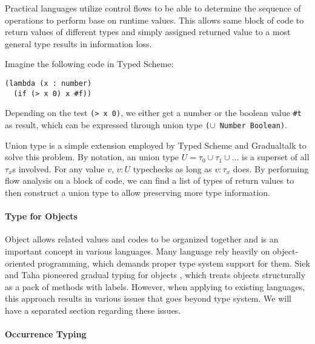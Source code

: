 Practical languages utilize control flows to be able to determine
the sequence of operations to perform base on runtime values.
This allows same block of code to return values of different types and simply
assigned returned value to a most general type results in information loss.

Imagine the following code in Typed Scheme:

\begin{verbatim}
(lambda (x : number)
  (if (> x 0) x #f))
\end{verbatim}

Depending on the test \texttt{(> x 0)}, we either get a number or the boolean value \texttt{\#t} as result,
which can be expressed through union type \texttt{($\cup$ Number Boolean)}.

Union type is a simple extension employed by Typed Scheme and Gradualtalk
to solve this problem.
By notation, an union type $U = \tau_0 \cup \tau_1 \cup \ldots$ is a superset of
all $\tau_x$s involved. For any value $v$, $v : U$ typechecks as long as $v : \tau_x$ does.
By performing flow analysis on a block of code, we can find a list of types of return values to
then construct a union type to allow preserving more type information.

\paragraph{Type for Objects}

Object allows related values and codes to be organized together and is an important concept
in various languages. Many language rely heavily on object-oriented programming,
which demands proper type system support for them.
Siek and Taha pioneered gradual typing for objects \cite{siek2007gradual}, which
treats objects structurally as a pack of methods with labels.
However, when applying to existing languages,
this approach results in various issues that goes beyond type system.
We will have a separated section regarding these issues.

\paragraph{Occurrence Typing}


